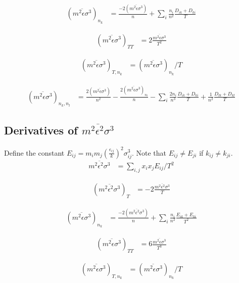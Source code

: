 \documentclass[english]{../thermomemo/thermomemo}
\newcommand{\lp}{\left(}
\newcommand{\rp}{\right)}
\begin{document}
\begin{align}
  (\overline{m^2\epsilon\sigma^3})_{n_k} &= \frac{-2(\overline{m^2\epsilon\sigma^3})}{n} + \sum_i \frac{n_i}{n^2} \frac{D_{ik} + D_{ki}}{T}
\end{align}

\begin{align}
  (\overline{m^2\epsilon \sigma^3})_{TT} & = 2\frac{\overline{m^2\epsilon \sigma^3}}{T^2}
\end{align}

\begin{align}
  (\overline{m^2\epsilon\sigma^3})_{T,n_k} &= (\overline{m^2\epsilon\sigma^3})_{n_k}/T
\end{align}

\begin{align}
  (\overline{m^2\epsilon\sigma^3})_{n_k,n_l} &= \frac{2(\overline{m^2\epsilon\sigma^3})}{n^2} - \frac{2(\overline{m^2\epsilon\sigma^3})_{n_l}}{n} - \sum_i \frac{2n_i}{n^3} \frac{D_{ik} + D_{ki}}{T} + \frac{1}{n^2} \frac{D_{lk} + D_{kl}}{T}
\end{align}

\subsection{Derivatives of $\overline{m^2\epsilon^2 \sigma^3}$}
Define the constant $E_{ij} = m_i m_j \lp \frac{\epsilon_{ij}}{k} \rp^2 \sigma_{ij}^3$. Note that
$E_{ij} \neq E_{ji}$ if $k_{ij} \neq k_{ji}$.
\begin{align}
  \overline{m^2\epsilon^2 \sigma^3} &= \sum_{i,j} x_i x_j E_{ij}/T^2
\end{align}

\begin{align}
  (\overline{m^2\epsilon^2 \sigma^3})_T &=  -2 \frac{\overline{m^2\epsilon^2 \sigma^3}}{T}
\end{align}

\begin{align}
  (\overline{m^2\epsilon\sigma^3})_{n_k} &= \frac{-2(\overline{m^2\epsilon^2 \sigma^3})}{n} + \sum_i \frac{n_i}{n^2} \frac{E_{ik} + E_{ki}}{T^2}
\end{align}

\begin{align}
  (\overline{m^2\epsilon \sigma^3})_{TT} & = 6\frac{\overline{m^2\epsilon \sigma^3}}{T^3}
\end{align}

\begin{align}
  (\overline{m^2\epsilon\sigma^3})_{T,n_k} &= (\overline{m^2\epsilon\sigma^3})_{n_k}/T
\end{align}
\end{document}
